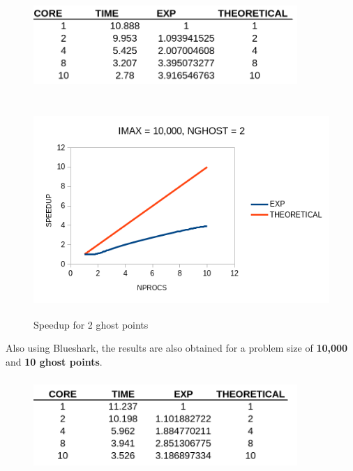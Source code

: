 \documentclass[12pt]{article}
\begin{document}
    \begin{figure}[H]
        \begin{center}
        \includegraphics[height = 35mm,width = 100mm]{table_1g_speed.png}              
        \end{center}  
    \end{figure}       


    \begin{figure}[hbt!]
        \begin{center}
        \hspace*{2.5cm}\includegraphics[height = 80mm,width = 140mm]{plot_1g_speed.png}
        \caption{Speedup for 2 ghost points}              
        \end{center}  
    \end{figure}    
    

    
    \newpage
    \noindent
    Also using Blueshark, the results are also obtained for a problem size of \textbf{10,000} and \textbf{10 ghost points}. 


    \begin{figure}[H]
        \begin{center}
        \includegraphics[height = 35mm,width = 100mm]{table_10g_speed.png}              
        \end{center}  
    \end{figure}       
\end{document}
